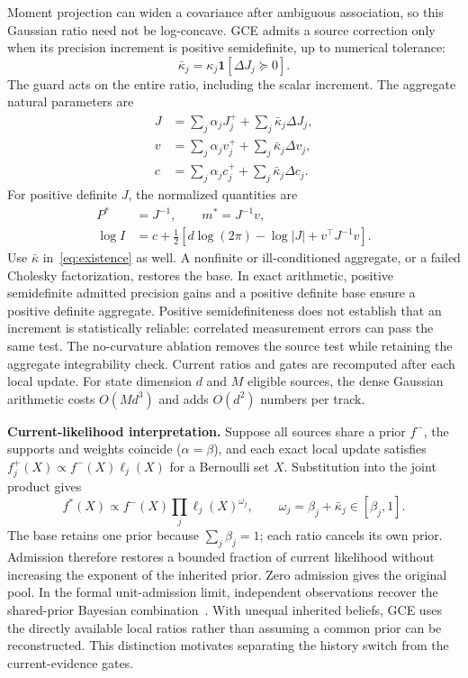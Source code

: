 Moment projection can widen a covariance after ambiguous association,
so this Gaussian ratio need not be log-concave. GCE admits a source correction only when its precision increment is
positive semidefinite, up to numerical tolerance:
\begin{equation}
 \bar\kappa_j=\kappa_j\mathbf1[\Delta J_j\succeq0].
 \label{eq:curvature}
\end{equation}
The guard acts on the entire ratio, including the scalar increment.
The aggregate natural parameters are
\begin{align}
 J&=\sum_j\alpha_jJ_j^++\sum_j\bar\kappa_j\Delta J_j,\\
 v&=\sum_j\alpha_jv_j^++\sum_j\bar\kappa_j\Delta v_j,\\
 c&=\sum_j\alpha_jc_j^++\sum_j\bar\kappa_j\Delta c_j.
 \label{eq:natural}
\end{align}
For positive definite $J$, the normalized quantities are
\begin{align}
 P^*&=J^{-1},\qquad m^*=J^{-1}v,\\
 \log I&=c+\tfrac12[d\log(2\pi)-\log|J|+v^\top J^{-1}v].
 \label{eq:integral}
\end{align}
Use $\bar\kappa$ in~\eqref{eq:existence} as well. A nonfinite or ill-conditioned aggregate, or a failed Cholesky factorization,
restores the base. In exact arithmetic, positive semidefinite admitted
precision gains and a positive definite base ensure a positive definite
aggregate. Positive semidefiniteness does not establish that an increment
is statistically reliable: correlated measurement errors can pass the
same test. The no-curvature ablation removes the source test while
retaining the aggregate integrability check. Current ratios and gates
are recomputed after each local update.
For state dimension $d$ and $M$ eligible sources, the dense Gaussian
arithmetic costs $O(Md^3)$ and adds $O(d^2)$ numbers per track.

\noindent\textbf{Current-likelihood interpretation.}
Suppose all sources share a prior $f^-$, the supports and weights coincide
($\alpha=\beta$), and each exact local update satisfies
$f_j^+(X)\propto f^-(X)\ell_j(X)$ for a Bernoulli set $X$.
Substitution into the joint product gives
\begin{equation}
 f^*(X)\propto f^-(X)\prod_j\ell_j(X)^{\omega_j},
 \qquad \omega_j=\beta_j+\bar\kappa_j\in[\beta_j,1].
 \label{eq:likelihoodpowers}
\end{equation}
The base retains one prior because $\sum_j\beta_j=1$; each ratio
cancels its own prior. Admission therefore restores a bounded fraction
of current likelihood without increasing the exponent of the inherited
prior. Zero admission gives the original pool. In the formal unit-admission
limit, independent observations recover the shared-prior Bayesian
combination~\cite{wu2022sharedpriors}. With unequal inherited beliefs,
GCE uses the directly available local ratios rather than assuming a common
prior can be reconstructed. This distinction motivates separating the
history switch from the current-evidence gates.

